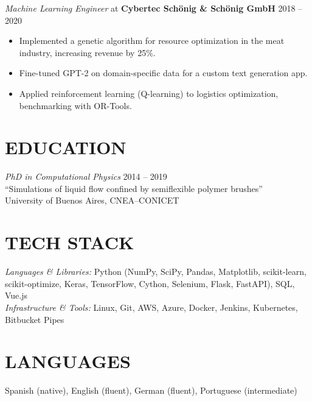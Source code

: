 \documentclass[margin]{res}
\begin{document}
\begin{resume}
{\sl Machine Learning Engineer} at {\bf Cybertec Sch\"onig \& Sch\"onig GmbH} \hfill 2018 -- 2020
\begin{itemize} \itemsep -2pt
    \item Implemented a genetic algorithm for resource optimization in the meat industry, increasing revenue by 25\%.
    \item Fine-tuned GPT-2 on domain-specific data for a custom text generation app.
    \item Applied reinforcement learning (Q-learning) to logistics optimization, benchmarking with OR-Tools.
\end{itemize}

\section{EDUCATION}
{\sl PhD in Computational Physics} \hfill 2014 -- 2019 \\
``Simulations of liquid flow confined by semiflexible polymer brushes'' \\
University of Buenos Aires, CNEA--CONICET

\section{TECH STACK}
{\sl Languages \& Libraries:} Python (NumPy, SciPy, Pandas, Matplotlib, scikit-learn, scikit-optimize, Keras, TensorFlow, Cython, Selenium, Flask, FastAPI), SQL, Vue.js \\
{\sl Infrastructure \& Tools:} Linux, Git, AWS, Azure, Docker, Jenkins, Kubernetes, Bitbucket Pipes

\section{LANGUAGES}
Spanish (native), English (fluent), German (fluent), Portuguese (intermediate)

\end{resume}
\end{document}
